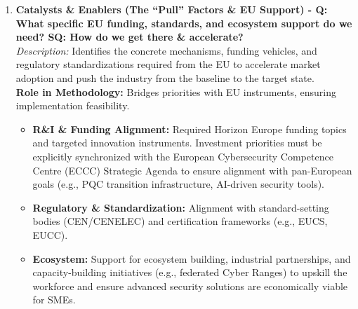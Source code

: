 \documentclass{ieeeaccess}
\begin{document}
\begin{enumerate}
    \item \textbf{Catalysts \& Enablers (The ``Pull'' Factors \& EU Support) - Q: What specific EU funding, standards, and ecosystem support do we need? SQ: How do we get there \& accelerate?}\\
    \textit{Description:} Identifies the concrete mechanisms, funding vehicles, and regulatory standardizations required from the EU to accelerate market adoption and push the industry from the baseline to the target state.\\
    \textbf{Role in Methodology:} Bridges priorities with EU instruments, ensuring implementation feasibility.
    \begin{itemize}
        \item \textbf{R\&I \& Funding Alignment:} Required Horizon Europe funding topics and targeted innovation instruments. Investment priorities must be explicitly synchronized with the European Cybersecurity Competence Centre (ECCC) Strategic Agenda \cite{eccc} to ensure alignment with pan-European goals (e.g., PQC transition infrastructure, AI-driven security tools).
        \item \textbf{Regulatory \& Standardization:} Alignment with standard-setting bodies (CEN/CENELEC) and certification frameworks (e.g., EUCS, EUCC).
        \item \textbf{Ecosystem:} Support for ecosystem building, industrial partnerships, and capacity-building initiatives (e.g., federated Cyber Ranges) to upskill the workforce and ensure advanced security solutions are economically viable for SMEs.
    \end{itemize}


\end{enumerate}
\end{document}
